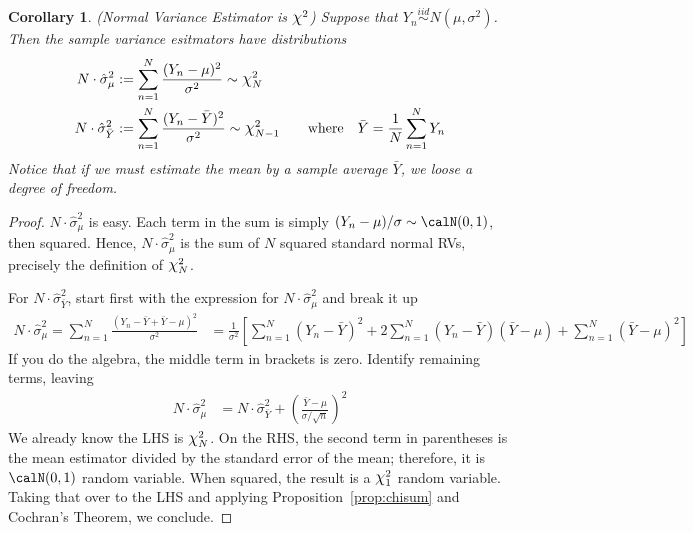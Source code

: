 \documentclass[12pt]{article}
\theoremstyle{plain}
\newtheorem{cor}[thm]{Corollary}
\theoremstyle{definition}
\theoremstyle{remark}
\newcommand*{\Chi}{\mbox{\large$\chi$}} %
\newcommand{\iid}{\overset{iid}{\sim}}
\newcommand{\sumnN}{\sum^N_{n=1}}
\begin{document}
\begin{cor}\emph{(Normal Variance Estimator is $\Chi^2$)}
\label{cor:chimu}
Suppose that $Y_n \iid N(\mu,\sigma^2)$. Then the sample variance
esitmators have distributions
\begin{align*}
  N\cdot \hat{\sigma}_\mu^2
  &:=
  \sumnN \frac{(Y_n-\mu)^2}{\sigma^2}  \sim \Chi^2_{N}
  \\
  N\cdot\hat{\sigma}_{\bar{Y}}^2
  &:=
  \sumnN \frac{(Y_n-\bar{Y})^2}{\sigma^2}  \sim \Chi^2_{N-1}
  \qquad\text{where}\quad
  \bar{Y}=\frac{1}{N}\sumnN Y_n
\end{align*}
Notice that if we must estimate the mean by a sample average $\bar{Y}$,
we loose a degree of freedom.
\end{cor}
\begin{proof}
$N\cdot \hat{\sigma}_\mu^2$ is easy.
Each term in the sum is simply $(Y_n-\mu)/\sigma \sim \calN(0,1)$, then
squared. Hence, $N\cdot \hat{\sigma}_\mu^2$ is the sum of $N$ squared
standard normal RVs, precisely the definition of $\Chi^2_N$.

For $N\cdot \hat{\sigma}_{\bar{Y}}^2$, start first with the expression
for $N\cdot \hat{\sigma}_\mu^2$ and break it up
\begin{align*}
  N\cdot \hat{\sigma}_\mu^2
  =
  \sumnN \frac{(Y_n-\bar{Y}+\bar{Y}-\mu)^2}{\sigma^2}
  &= \frac{1}{\sigma^2}
  \left[
    \sumnN  (Y_n - \bar{Y})^2
    + 2\sumnN (Y_n-\bar{Y})(\bar{Y}-\mu)
    + \sumnN (\bar{Y}-\mu)^2
  \right]
\end{align*}
If you do the algebra, the middle term in brackets is zero.
Identify remaining terms, leaving
\begin{align*}
  N\cdot \hat{\sigma}_\mu^2
  &=
  N\cdot \hat{\sigma}_{\bar{Y}}^2
  +
  \left(\frac{\bar{Y}-\mu }{\sigma /\sqrt{n}}\right)^2
\end{align*}
We already know the LHS is $\Chi^2_N$.  On the RHS, the second term in
parentheses is the mean estimator divided by the standard error of the
mean; therefore, it is $\calN(0,1)$ random variable. When squared, the
result is a $\Chi_1^2$ random variable. Taking that over to the LHS and
applying Proposition~\ref{prop:chisum} and Cochran's Theorem, we
conclude.
\end{proof}
\end{document}
